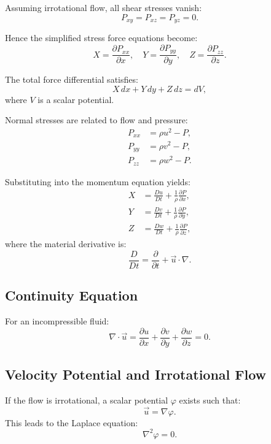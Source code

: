 \documentclass[12pt]{article}
\begin{document}
    Assuming irrotational flow, all shear stresses vanish:
    \begin{equation}
        P_{xy} = P_{xz} = P_{yz} = 0.
    \end{equation}

    Hence the simplified stress force equations become:
    \begin{equation}
        X = \frac{\partial P_{xx}}{\partial x}, \quad
        Y = \frac{\partial P_{yy}}{\partial y}, \quad
        Z = \frac{\partial P_{zz}}{\partial z}.
    \end{equation}

    The total force differential satisfies:
    \begin{equation}
        X\, dx + Y\, dy + Z\, dz = dV,
    \end{equation}
    where \(V\) is a scalar potential.

    Normal stresses are related to flow and pressure:
    \begin{align}
        P_{xx} &= \rho u^2 - P, \\
        P_{yy} &= \rho v^2 - P, \\
        P_{zz} &= \rho w^2 - P.
    \end{align}

    Substituting into the momentum equation yields:
    \begin{align}
        X &= \frac{D u}{D t} + \frac{1}{\rho} \frac{\partial P}{\partial x}, \\
        Y &= \frac{D v}{D t} + \frac{1}{\rho} \frac{\partial P}{\partial y}, \\
        Z &= \frac{D w}{D t} + \frac{1}{\rho} \frac{\partial P}{\partial z},
    \end{align}
    where the material derivative is:
    \begin{equation}
        \frac{D}{D t} = \frac{\partial}{\partial t} + \vec{u} \cdot \nabla.
    \end{equation}

    \subsection{Continuity Equation}
    For an incompressible fluid:
    \begin{equation}
        \nabla \cdot \vec{u} = \frac{\partial u}{\partial x} + \frac{\partial v}{\partial y} + \frac{\partial w}{\partial z} = 0.
    \end{equation}

    \subsection*{Velocity Potential and Irrotational Flow}
    If the flow is irrotational, a scalar potential \(\varphi\) exists such that:
    \begin{equation}
        \vec{u} = \nabla \varphi.
    \end{equation}
    This leads to the Laplace equation:
    \begin{equation}
        \nabla^2 \varphi = 0.
    \end{equation}
\end{document}
